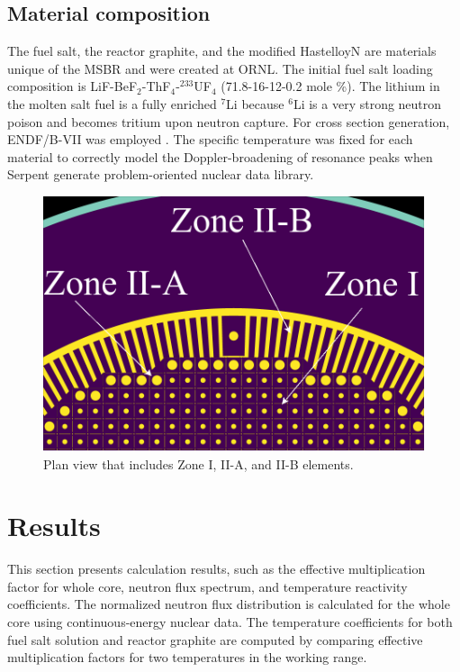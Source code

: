 \documentclass{anstrans}
\begin{document}
\subsection{Material composition}
The fuel salt, the reactor graphite, and the modified HastelloyN are materials 
unique of the \gls{MSBR} and were created at \gls{ORNL}. The initial fuel salt 
loading composition is LiF-BeF$_2$-ThF$_4$-$^{233}$UF$_4$ (71.8-16-12-0.2 mole 
\%). The lithium in the molten salt fuel is a fully enriched $^{7}$Li because 
$^{6}$Li is a very strong neutron poison and becomes tritium upon neutron 
capture. For cross section generation, ENDF/B-VII was employed 
\cite{chadwick_endf/b-vii.0:_2006}. The specific temperature was fixed for each 
material to correctly model the Doppler-broadening of resonance peaks when 
Serpent generate problem-oriented nuclear data library.
\begin{figure}[htbp!] %
  \centering
  \includegraphics[width=0.89\linewidth]{figure_2_5.png}
  \caption{Plan view that includes Zone I, II-A, and II-B elements.}
    \vspace{-0.6em}
  \label{fig:zone2B}
\end{figure}
\FloatBarrier
\section{Results}
This section presents calculation results, such as the effective multiplication 
factor for whole core, neutron flux spectrum, and temperature reactivity 
coefficients. The normalized neutron flux distribution is calculated for the 
whole core using continuous-energy nuclear data.
The temperature coefficients for both fuel salt solution and reactor graphite 
are computed by comparing effective multiplication factors for two temperatures 
in the working range.
 	
\end{document}
